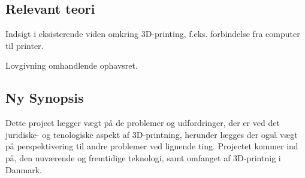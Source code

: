 \subsection{Relevant teori} %
\label{sub:relevant_teori}

Indsigt i eksisterende viden omkring 3D-printing, f.eks. forbindelse fra computer til printer.

Lovgivning omhandlende ophavsret.

\subsection{Ny Synopsis}
\label{sub: Synopsis}
Dette project lægger vægt på de problemer og udfordringer, der er ved det juridiske- og tenologiske aspekt af 3D-printning, herunder lægges der også vægt på perspektivering til andre problemer ved lignende ting. Projectet kommer ind på, den nuværende og fremtidige teknologi, samt omfanget af 3D-printnig i Danmark.


